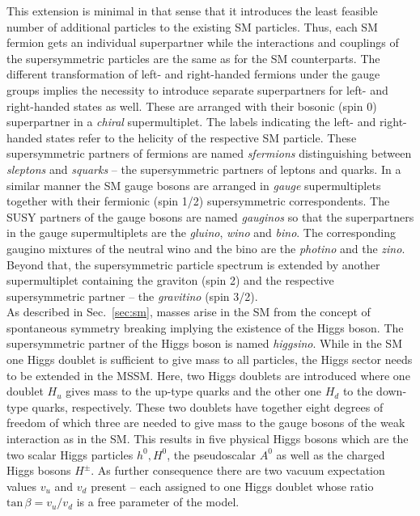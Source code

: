 This extension is minimal in that sense that it introduces the least feasible number of additional particles to the existing SM particles. Thus, each SM fermion gets an individual superpartner while the interactions and couplings of the supersymmetric particles are the same as for the SM counterparts. The different transformation of left- and right-handed fermions under the gauge groups implies the necessity to introduce separate superpartners for left- and right-handed states as well. These are arranged with their bosonic (spin 0) superpartner in a \textit{chiral} supermultiplet. The labels indicating the left- and right-handed states refer to the helicity of the respective SM particle. These supersymmetric partners of fermions are named \textit{sfermions} distinguishing between \textit{sleptons} and \textit{squarks} -- the supersymmetric partners of leptons and quarks. In a similar manner the SM gauge bosons are arranged in \textit{gauge} supermultiplets together with their fermionic (spin 1/2) supersymmetric correspondents. The SUSY partners of the gauge bosons are named \textit{gauginos} so that the superpartners in the gauge supermultiplets are the \textit{gluino}, \textit{wino} and \textit{bino}. The corresponding gaugino mixtures of the neutral wino and the bino are the \textit{photino} and the \textit{zino}. Beyond that, the supersymmetric particle spectrum is extended by another supermultiplet containing the graviton (spin 2) and the respective supersymmetric partner -- the \textit{gravitino} (spin 3/2). \\
As described in Sec.~\ref{sec:sm}, masses arise in the SM from the concept of spontaneous symmetry breaking implying the existence of the Higgs boson. The supersymmetric partner of the Higgs boson is named \textit{higgsino}. While in the SM one Higgs doublet is sufficient to give mass to all particles, the Higgs sector needs to be extended in the MSSM. Here, two Higgs doublets are introduced where one doublet $H_u$ gives mass to the up-type quarks and the other one $H_d$ to the down-type quarks, respectively. These two doublets have together eight degrees of freedom of which three are needed to give mass to the gauge bosons of the weak interaction as in the SM. This results in five physical Higgs bosons which are the two scalar Higgs particles $h^0, H^0$, the pseudoscalar $A^0$ as well as the charged Higgs bosons $H^{\pm}$. As further consequence there are two vacuum expectation values $v_u$ and $v_d$ present -- each assigned to one Higgs doublet whose ratio $\mathrm{tan} \, \beta = v_u/v_d$ is a free parameter of the model. \\
